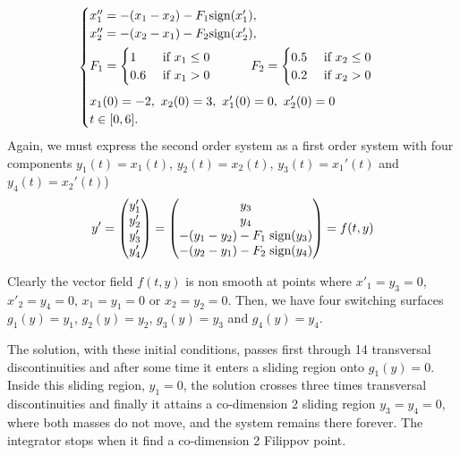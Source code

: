 \documentclass{article}
\begin{document}
\begin{description}
\[
\begin{cases}
x_1''  = - (x_1 - x_2) - F_1 \hbox{sign}(x_1'),  & \\
x_2''  = - (x_2 - x_1) - F_2 \hbox{sign}(x_2'),  & \\[4pt]
F_1=
\begin{cases}
1 & \hbox{ if } x_1 \le 0 \\
0.6  &\hbox{ if } x_1 > 0
\end{cases}
\qquad \quad
F_2=
\begin{cases}
0.5 & \hbox{ if } x_2 \le 0 \\ 0.2 & \hbox{ if } x_2 > 0
\end{cases}
\\
x_1(0) = -2, \ x_2(0)=3, \ x_1'(0)= 0, \ x_2'(0)=0  \vrule width 0pt height 16pt \\
t\in[0,6].
\end{cases}
\]
Again, we must express the second order system as a first order system with
four components $y_1(t)=x_1(t)$, $y_2(t)=x_2(t)$, $y_3(t)=x_1'(t)$ and $y_4(t)=x_2'(t)$)
\[
y'=\begin{pmatrix} y_1' \\y'_2 \\y'_3 \\y'_4\end{pmatrix}=
\begin{pmatrix} y_3 \\ y_4 \\ - (y_1 - y_2) - F_1\; \hbox{sign}(y_3) \\
- (y_2 - y_1) - F_2\; \hbox{sign}(y_4)
\end{pmatrix} = f(t,y)
\]

Clearly the vector field $f(t,y)$ is non smooth at points where $x'_1=y_3=0$, $x'_2=y_4=0$,
$x_1=y_1=0$ or $x_2=y_2=0$. Then, we have four switching surfaces  $g_1(y)=y_1$, $g_2(y)=y_2$,
$g_3(y)=y_3$ and $g_4(y)=y_4$.

The solution, with these initial conditions,
passes first through 14 transversal discontinuities and after some time it enters a sliding
region onto $g_1(y)=0$.  Inside this sliding region, $y_1=0$, the solution crosses three times transversal
discontinuities and finally
it attains a co-dimension 2 sliding region $y_3=y_4=0$, where both masses do not move, and
the system remains there forever.  The integrator stops when it find a co-dimension 2 Filippov point.


\end{description}
\end{document}
